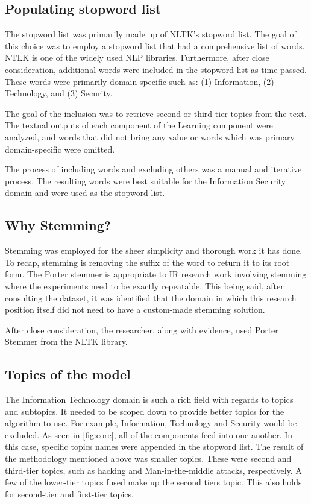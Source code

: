 \subsection{Populating stopword list}
The stopword list was primarily made up of NLTK's stopword list. The goal of this choice was to employ a stopword list that had a comprehensive list of words. NTLK is one of the widely used NLP libraries.
Furthermore, after close consideration, additional words were included in the stopword list as time passed. These words were primarily domain-specific such as: (1) Information, (2) Technology, and (3) Security.

The goal of the inclusion was to retrieve second or third-tier topics from the text. The textual outputs of each component of the Learning component were analyzed, and words that did not bring any value or words which was primary domain-specific were omitted.

The process of including words and excluding others was a manual and iterative process. The resulting words were best suitable for the Information Security domain and were used as the stopword list.

\subsection{Why Stemming?} \label{ssec:stemming}
Stemming was employed for the sheer simplicity and thorough work it has done. To recap, stemming is removing the suffix of the word to return it to its root form. 
The Porter stemmer is appropriate to IR research work involving stemming where the experiments need to be exactly repeatable. This being said, after consulting the dataset, it was identified that the domain in which this research position itself did not need to have a custom-made stemming solution.

After close consideration, the researcher, along with evidence, used Porter Stemmer from the NLTK library.

\subsection{Topics of the model}
The Information Technology domain is such a rich field with regards to topics and subtopics. It needed to be scoped down to provide better topics for the algorithm to use. For example, Information, Technology and Security would be excluded. As seen in \ref{fig:core}, all of the components feed into one another. In this case, specific topics names were appended in the stopword list. 
The result of the methodology mentioned above was smaller topics. These were second and third-tier topics, such as hacking and Man-in-the-middle attacks, respectively.
A few of the lower-tier topics fused make up the second tiers topic. This also holds for second-tier and first-tier topics.

